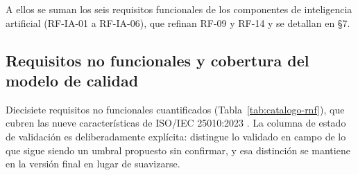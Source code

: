 A ellos se suman los seis requisitos funcionales de los componentes de inteligencia artificial (RF-IA-01 a RF-IA-06), que refinan RF-09 y RF-14 y se detallan en \S7.

\subsection{Requisitos no funcionales y cobertura del modelo de calidad}

Diecisiete requisitos no funcionales cuantificados (Tabla~\ref{tab:catalogo-rnf}), que cubren las nueve caracter\'isticas de ISO/IEC 25010:2023 \cite{iso25010_2023}. La columna de estado de validaci\'on es deliberadamente expl\'icita: distingue lo validado en campo de lo que sigue siendo un umbral propuesto sin confirmar, y esa distinci\'on se mantiene en la versi\'on final en lugar de suavizarse.

